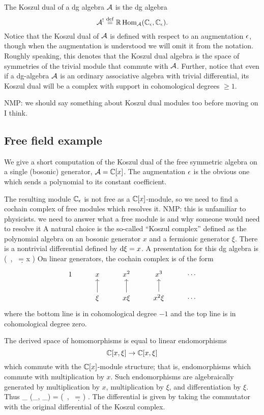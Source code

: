 \documentclass[11pt]{amsart}
\def\natalie#1{{\textcolor{green!65!black}{NMP: {#1}}}}
\begin{document}
The Koszul dual of a dg algebra $\mathcal A$ is the dg algebra
\[
\mathcal A^! \overset{\rm def}{=} \mathbb{R}\operatorname{Hom}_\mathcal A(\mathbb C_\epsilon,\mathbb C_\epsilon) .
\] 
Notice that the Koszul dual of $\mathcal A$ is defined with respect to an augmentation $\epsilon$, though when the augmentation is understood we will omit it from the notation. Roughly speaking, this denotes that the Koszul dual algebra is the space of symmetries of the trivial module that commute with $\mathcal A$. Further, notice that even if a dg-algebra $\mathcal A$ is an ordinary associative algebra with trivial differential, its Koszul dual will be a complex with support in cohomological degrees $\geq 1$. 



\natalie{we should say something about Koszul dual modules too before moving on I think.}

\subsection{Free field example} 

We give a short computation of the Koszul dual of the free symmetric algebra on a single (bosonic) generator, $\mathcal A = \mathbb C[x]$. 
The augmentation $\epsilon$ is the obvious one which sends a polynomial to its constant coefficient. 

The resulting module $\mathbb C_{\epsilon}$ is not free as a $\mathbb C[x]$-module, so we need to find a cochain complex of free modules which resolves it. \natalie{this is unfamiliar to physicists. we need to answer what a free module is and why someone would need to resolve it}
A natural choice is the so-called ``Koszul complex'' defined as the polynomial algebra on an bosonic generator $x$ and a fermionic generator $\xi$. 
There is a nontrivial differential defined by ${\rm d} \xi = x$. 
A presentation for this dg algebra is 
\beqn\label{eqn:res1}
\bigg(\CC[x, \xi] \, , \, \d = x \frac{\partial}{\partial \xi} \bigg) 
\eeqn
On linear generators, the cochain complex is of the form
\[
\begin{tikzcd} 
1 & x & x^2 & x^3 & \cdots \\
& \xi \ar[u] & x \xi \ar[u] & x^2 \xi \ar[u] & \cdots 
\end{tikzcd}
\]
where the bottom line is in cohomological degree $-1$ and the top line is in cohomological degree zero. 

The derived space of homomorphisms is equal to linear endomorphisms 
\[
\mathbb C[x, \xi] \to \mathbb C[x,\xi]
\] 
which commute with the $\mathbb C[x]$-module structure; that is, endomorphisms which commute with multiplication by $x$. 
Such endomorphisms are algebraically generated by multiplication by $x$, multiplication by $\xi$, and differentiation by $\xi$. 
Thus 
\beqn\label{eqn:rhom1}
\RHom_{\CC[x]} \left(\CC_\ep, \CC_\ep\right) = \left(\CC{} \, , \, \d =  \right) .
\eeqn
The differential is given by taking the commutator with the original differential of the Koszul complex. 
\end{document}
